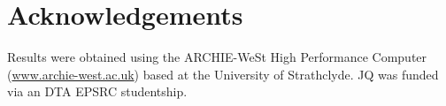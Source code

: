 \chapter{Acknowledgements}

Results were obtained using the ARCHIE-WeSt High Performance Computer
(\url{www.archie-west.ac.uk}) based at the University of
Strathclyde. JQ was funded via an DTA EPSRC studentship. 

